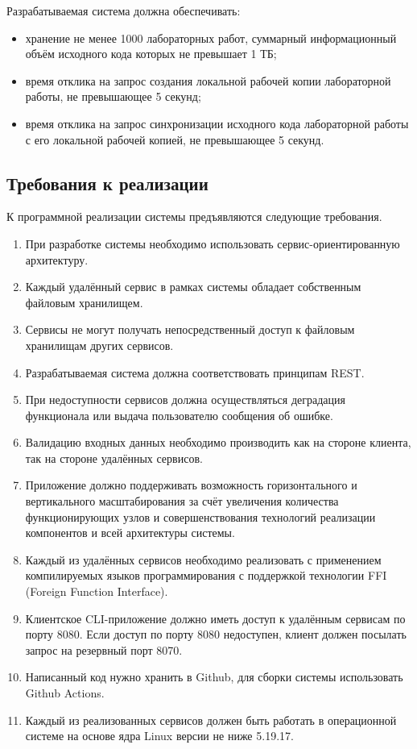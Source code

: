\documentclass{bmstu}
\begin{document}
  Разрабатываемая система должна обеспечивать:
  \begin{itemize}[label=---]
    \item хранение не менее 1000 лабораторных работ, суммарный
      информационный объём исходного кода которых не превышает 1 ТБ;
    \item время отклика на запрос создания локальной рабочей копии лабораторной работы,
      не превышающее 5 секунд;
    \item время отклика на запрос синхронизации исходного кода лабораторной работы с его локальной
      рабочей копией, не превышающее 5 секунд.
  \end{itemize}

  \subsection{Требования к реализации}
  
  К программной реализации системы предъявляются следующие требования.
  \begin{enumerate}
  	\item При разработке системы необходимо использовать сервис-ориентированную архитектуру.
  	\item Каждый удалённый сервис в рамках системы обладает собственным файловым хранилищем.
  	\item Сервисы не могут получать непосредственный доступ к файловым хранилищам других сервисов.
  	\item Разрабатываемая система должна соответствовать принципам REST.
  	\item При недоступности сервисов должна осуществляться деградация
  	функционала или выдача пользователю сообщения об ошибке.
  	\item Валидацию входных данных необходимо производить как на стороне клиента, так на стороне удалённых сервисов.
  	\item Приложение должно поддерживать возможность горизонтального и вертикального масштабирования за счёт увеличения количества функционирующих узлов и совершенствования технологий реализации компонентов и всей архитектуры системы.
  	\item Каждый из удалённых сервисов необходимо реализовать с применением компилируемых языков программирования с поддержкой технологии FFI (Foreign Function Interface).
  	\item Клиентское CLI-приложение должно иметь доступ к удалённым сервисам по порту 8080. Если доступ по порту 8080 недоступен, клиент должен посылать запрос на резервный порт 8070.
  	\item Написанный код нужно хранить в Github, для сборки системы использовать Github Actions.
  	\item Каждый из реализованных сервисов должен быть работать в операционной системе на основе ядра Linux версии не ниже 5.19.17.
  \end{enumerate}
  
\end{document}
